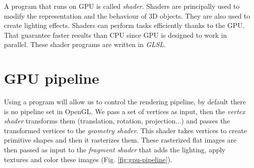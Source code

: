 A program that runs on GPU is called \textit{shader}. Shaders are principally used to modify the representation and the behaviour of 3D objects. They are also used to create lighting effects.  Shaders can perform tasks efficiently thanks to the GPU. That guarantee faster results than CPU since GPU is designed to work in parallel.
These shader programs are written in \textit{GLSL}.

\section{GPU pipeline}
Using a program will allow us to control the rendering pipeline, by default there is no pipeline set in OpenGL. We pass a set of vertices as input, then the \textit{vertex shader} transforms them (translation, rotation, projection...) and passes the transformed vertices to the \textit{geometry shader}. This shader takes vertices to create primitive shapes and then it rasterizes them. These rasterized flat images are then passed as input to the \textit{fragment shader} that adds the lighting, apply textures and color these images (Fig. \ref{fig:gpu-pipeline}).
